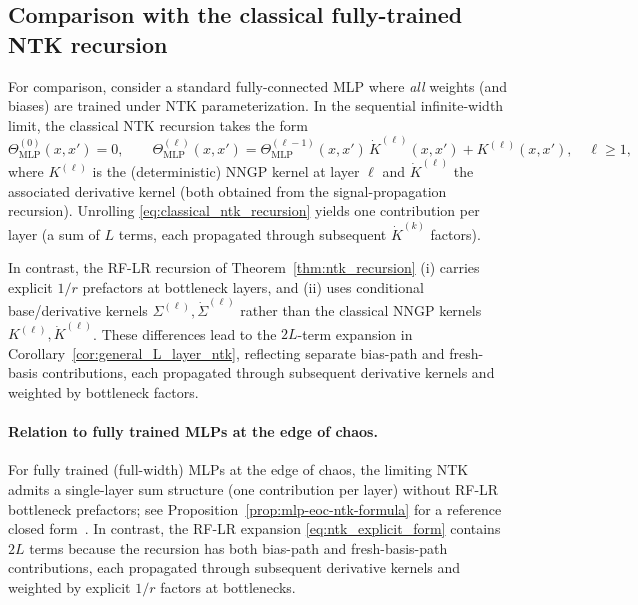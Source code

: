 \subsection{Comparison with the classical fully-trained NTK recursion}\label{appendix:classical-ntk-comparison}
For comparison, consider a standard fully-connected MLP where \emph{all} weights (and biases) are trained under NTK parameterization. In the sequential infinite-width limit, the classical NTK recursion takes the form~\cite{jacot2018neural}
\begin{equation}
\label{eq:classical_ntk_recursion}
\Theta_{\mathrm{MLP}}^{(0)}(x,x')=0,\qquad
\Theta_{\mathrm{MLP}}^{(\ell)}(x,x')=\Theta_{\mathrm{MLP}}^{(\ell-1)}(x,x')\,\dot{K}^{(\ell)}(x,x')+K^{(\ell)}(x,x'),\quad \ell\ge 1,
\end{equation}
where \(K^{(\ell)}\) is the (deterministic) NNGP kernel at layer \(\ell\) and \(\dot{K}^{(\ell)}\) the associated derivative kernel (both obtained from the signal-propagation recursion).
Unrolling \eqref{eq:classical_ntk_recursion} yields one contribution per layer (a sum of \(L\) terms, each propagated through subsequent \(\dot{K}^{(k)}\) factors).

In contrast, the RF-LR recursion of Theorem~\ref{thm:ntk_recursion} (i) carries explicit \(1/r\) prefactors at bottleneck layers, and (ii) uses conditional base/derivative kernels \(\Sigma^{(\ell)},\dot{\Sigma}^{(\ell)}\) rather than the classical NNGP kernels \(K^{(\ell)},\dot{K}^{(\ell)}\). These differences lead to the \(2L\)-term expansion in Corollary~\ref{cor:general_L_layer_ntk}, reflecting separate bias-path and fresh-basis contributions, each propagated through subsequent derivative kernels and weighted by bottleneck factors.

\paragraph{Relation to fully trained MLPs at the edge of chaos.}
For fully trained (full-width) MLPs at the edge of chaos, the limiting NTK admits a single-layer sum structure (one contribution per layer) without RF-LR bottleneck prefactors; see Proposition~\ref{prop:mlp-eoc-ntk-formula} for a reference closed form~\cite{terjek2025mlpsateoc}. In contrast, the RF-LR expansion \eqref{eq:ntk_explicit_form} contains \(2L\) terms because the recursion has both bias-path and fresh-basis-path contributions, each propagated through subsequent derivative kernels and weighted by explicit \(1/r\) factors at bottlenecks.

